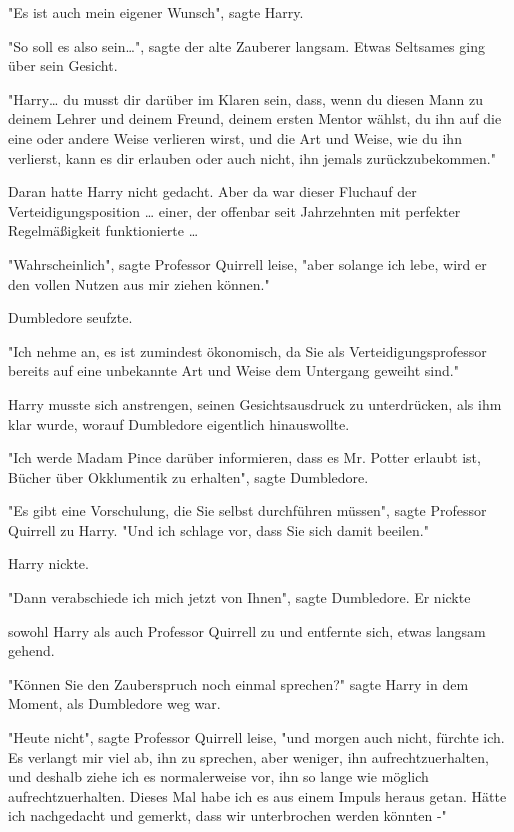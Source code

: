 {"Es ist auch mein eigener Wunsch", sagte Harry.

"So soll es also sein…", sagte der alte Zauberer langsam. Etwas Seltsames ging über sein Gesicht.

"Harry… du musst dir darüber im Klaren sein, dass, wenn du diesen Mann zu deinem Lehrer und deinem Freund, deinem ersten Mentor wählst, du ihn auf die eine oder andere Weise verlieren wirst, und die Art und Weise, wie du ihn verlierst, kann es dir erlauben oder auch nicht, ihn jemals zurückzubekommen."

Daran hatte Harry nicht gedacht. Aber da war dieser Fluchauf der Verteidigungsposition … einer, der offenbar seit Jahrzehnten mit perfekter Regelmäßigkeit funktionierte …

"Wahrscheinlich", sagte Professor Quirrell leise, "aber solange ich lebe, wird er den vollen Nutzen aus mir ziehen können."

Dumbledore seufzte.

"Ich nehme an, es ist zumindest ökonomisch, da Sie als Verteidigungsprofessor bereits auf eine unbekannte Art und Weise dem Untergang geweiht sind."

Harry musste sich anstrengen, seinen Gesichtsausdruck zu unterdrücken, als ihm klar wurde, worauf Dumbledore eigentlich hinauswollte.

"Ich werde Madam Pince darüber informieren, dass es Mr. Potter erlaubt ist, Bücher über Okklumentik zu erhalten", sagte Dumbledore.

"Es gibt eine Vorschulung, die Sie selbst durchführen müssen", sagte Professor Quirrell zu Harry. "Und ich schlage vor, dass Sie sich damit beeilen."

Harry nickte.

"Dann verabschiede ich mich jetzt von Ihnen", sagte Dumbledore. Er nickte

sowohl Harry als auch Professor Quirrell zu und entfernte sich, etwas langsam gehend.

"Können Sie den Zauberspruch noch einmal sprechen?" sagte Harry in dem Moment, als Dumbledore weg war.

"Heute nicht", sagte Professor Quirrell leise, "und morgen auch nicht, fürchte ich. Es verlangt mir viel ab, ihn zu sprechen, aber weniger, ihn aufrechtzuerhalten, und deshalb ziehe ich es normalerweise vor, ihn so lange wie möglich aufrechtzuerhalten. Dieses Mal habe ich es aus einem Impuls heraus getan. Hätte ich nachgedacht und gemerkt, dass wir unterbrochen werden könnten -"

}
